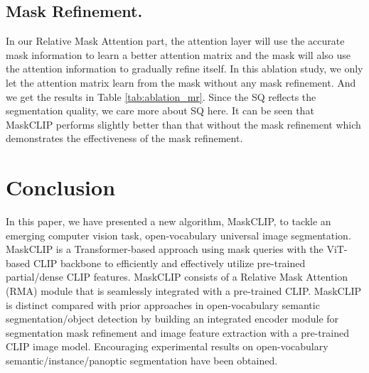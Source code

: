 \documentclass{article}
\theoremstyle{plain}
\theoremstyle{definition}
\theoremstyle{remark}
\begin{document}
\subsection{Mask Refinement.}

In our Relative Mask Attention part, the attention layer will use the accurate mask information to learn a better attention matrix and the mask will also use the attention information to gradually refine itself. In this ablation study, we only let the attention matrix learn from the mask without any mask refinement. And we get the results in Table \ref{tab:ablation_mr}. Since the SQ reflects the segmentation quality, we care more about SQ here. It can be seen that MaskCLIP performs slightly better than that without the mask refinement which demonstrates the effectiveness of the mask refinement.

\begin{table}[!htp]
\begin{center}
\caption{\textbf{Ablation Study on Mask Refinement.} Results on ADE20K validation set are reported here. Both methods are trained on COCO and tested on ADE20K validation dataset. MR refers to mask refinement.}
\label{tab:ablation_mr}
\end{center}
\end{table}

\section{Conclusion}

In this paper, we have presented a new algorithm, MaskCLIP, to tackle an emerging computer vision task, open-vocabulary universal image segmentation. MaskCLIP is a Transformer-based approach using mask queries with the ViT-based CLIP backbone to efficiently and effectively utilize pre-trained partial/dense CLIP features. MaskCLIP consists of a Relative Mask Attention (RMA) module that is seamlessly integrated with a pre-trained CLIP. MaskCLIP is distinct  compared with prior approaches in open-vocabulary semantic segmentation/object detection by building an integrated encoder module for segmentation mask refinement and image feature extraction with a pre-trained CLIP image model. Encouraging experimental results on open-vocabulary semantic/instance/panoptic segmentation have been obtained.
\end{document}
